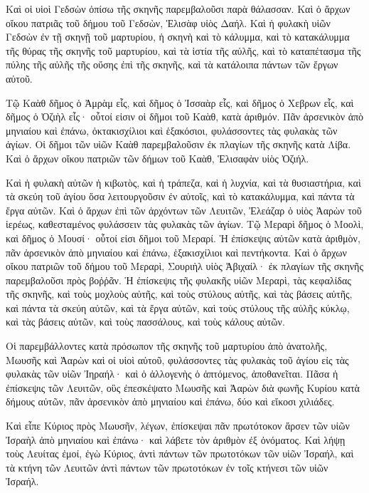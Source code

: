 {Καὶ οἱ υἱοὶ Γεδσὼν ὀπίσω τῆς σκηνῆς παρεμβαλοῦσι παρὰ θάλασσαν.
Καὶ ὁ ἄρχων οἴκου πατριᾶς τοῦ δήμου τοῦ Γεδσὼν, Ἑλισὰφ υἱὸς Δαήλ.
Καὶ ἡ φυλακὴ υἱῶν Γεδσὼν ἐν τῇ σκηνῇ τοῦ μαρτυρίου, ἡ σκηνὴ καὶ τὸ κάλυμμα, καὶ τὸ κατακάλυμμα τῆς θύρας τῆς σκηνῆς τοῦ μαρτυρίου,
καὶ τὰ ἱστία τῆς αὐλῆς, καὶ τὸ καταπέτασμα τῆς πύλης τῆς αὐλῆς τῆς οὔσης ἐπὶ τῆς σκηνῆς, καὶ τὰ κατάλοιπα πάντων τῶν ἔργων αὐτοῦ.
\par }{\PP {}Τῷ Καὰθ δῆμος ὁ Ἀμρὰμ εἷς, καὶ δῆμος ὁ Ἰσσαὰρ εἷς, καὶ δῆμος ὁ Χεβρων εἷς, καὶ δῆμος ὁ Ὀζιὴλ εἷς· οὗτοί εἰσιν οἱ δῆμοι τοῦ Καὰθ, κατὰ ἀριθμόν.
Πᾶν ἀρσενικὸν ἀπὸ μηνιαίου καὶ ἐπάνω, ὀκτακισχίλιοι καὶ ἑξακόσιοι, φυλάσσοντες τὰς φυλακὰς τῶν ἁγίων.
Οἱ δῆμοι τῶν υἱῶν Καὰθ παρεμβαλοῦσιν ἐκ πλαγίων τῆς σκηνῆς κατὰ Λίβα.
Καὶ ὁ ἄρχων οἴκου πατριῶν τῶν δήμων τοῦ Καὰθ, Ἑλισαφὰν υἱὸς Ὀζιήλ.
\par }{\PP {}Καὶ ἡ φυλακὴ αὐτῶν ἡ κιβωτὸς, καὶ ἡ τράπεζα, καὶ ἡ λυχνία, καὶ τὰ θυσιαστήρια, καὶ τὰ σκεύη τοῦ ἁγίου ὅσα λειτουργοῦσιν ἐν αὐτοῖς, καὶ τὸ κατακάλυμμα, καὶ πάντα τὰ ἔργα αὐτῶν.
Καὶ ὁ ἄρχων ἐπὶ τῶν ἀρχόντων τῶν Λευιτῶν, Ἐλεάζαρ ὁ υἱὸς Ἀαρὼν τοῦ ἱερέως, καθεσταμένος φυλάσσειν τὰς φυλακὰς τῶν ἁγίων.
Τῷ Μεραρὶ δῆμος ὁ Μοολὶ, καὶ δῆμος ὁ Μουσί· οὗτοί εἰσι δῆμοι τοῦ Μεραρί.
Ἡ ἐπίσκεψις αὐτῶν κατὰ ἀριθμὸν, πᾶν ἀρσενικὸν ἀπὸ μηνιαίου καὶ ἐπάνω, ἑξακισχίλιοι καὶ πεντήκοντα.
Καὶ ὁ ἄρχων οἴκου πατριῶν τοῦ δήμου τοῦ Μεραρὶ, Σουριὴλ υἱὸς Ἀβιχαίλ· ἐκ πλαγίων τῆς σκηνῆς παρεμβαλοῦσι πρὸς βοῤῥᾶν.
Ἡ ἐπίσκεψις τῆς φυλακῆς υἱῶν Μεραρὶ, τὰς κεφαλίδας τῆς σκηνῆς, καὶ τοὺς μοχλοὺς αὐτῆς, καὶ τοὺς στύλους αὐτῆς, καὶ τὰς βάσεις αὐτῆς, καὶ πάντα τὰ σκεύη αὐτῶν, καὶ τὰ ἔργα αὐτῶν,
καὶ τοὺς στύλους τῆς αὐλῆς κύκλῳ, καὶ τὰς βάσεις αὐτῶν, καὶ τοὺς πασσάλους, καὶ τοὺς κάλους αὐτῶν.
\par }{\PP {}Οἱ παρεμβάλλοντες κατὰ πρόσωπον τῆς σκηνῆς τοῦ μαρτυρίου ἀπὸ ἀνατολῆς, Μωυσῆς καὶ Ἀαρὼν καὶ οἱ υἱοὶ αὐτοῦ, φυλάσσοντες τὰς φυλακὰς τοῦ ἁγίου εἰς τὰς φυλακὰς τῶν υἱῶν Ἰηραήλ· καὶ ὁ ἀλλογενὴς ὁ ἁπτόμενος, ἀποθανεῖται.
Πᾶσα ἡ ἐπίσκεψις τῶν Λευιτῶν, οὓς ἐπεσκέψατο Μωυσῆς καὶ Ἀαρὼν διὰ φωνῆς Κυρίου κατὰ δήμους αὐτῶν, πᾶν ἀρσενικὸν ἀπὸ μηνιαίου καὶ ἐπάνω, δύο καὶ εἴκοσι χιλιάδες.
\par }{\PP {}Καὶ εἶπε Κύριος πρὸς Μωυσῆν, λέγων, ἐπίσκεψαι πᾶν πρωτότοκον ἄρσεν τῶν υἱῶν Ἰσραὴλ ἀπὸ μηνιαίου καὶ ἐπάνω· καὶ λάβετε τὸν ἀριθμὸν ἐξ ὀνόματος.
Καὶ λήψῃ τοὺς Λευίτας ἐμοί, ἐγὼ Κύριος, ἀντὶ πάντων τῶν πρωτοτόκων τῶν υἱῶν Ἰσραήλ, καὶ τὰ κτήνη τῶν Λευιτῶν ἀντὶ πάντων τῶν πρωτοτόκων ἐν τοῖς κτήνεσι τῶν υἱῶν Ἰσραήλ.
}

